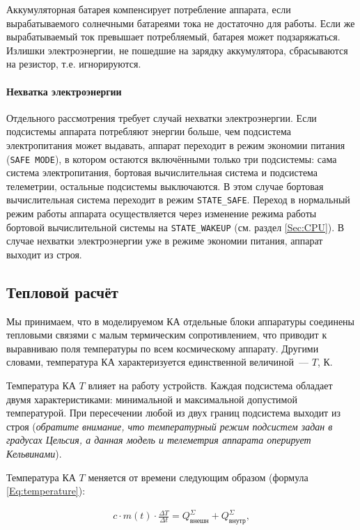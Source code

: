 \documentclass[12pt,a4paper]{article}
\begin{document}
Аккумуляторная батарея компенсирует потребление аппарата, если вырабатываемого солнечными
батареями тока не достаточно для работы. Если же вырабатываемый ток превышает
потребляемый, батарея может подзаряжаться. Излишки электроэнергии, не пошедшие на зарядку
аккумулятора, сбрасываются на резистор, т.е. игнорируются.

\paragraph{Нехватка электроэнергии}

Отдельного рассмотрения требует случай нехватки электроэнергии. Если подсистемы аппарата
потребляют энергии больше, чем подсистема электропитания может выдавать, аппарат переходит
в режим экономии питания (\verb'SAFE MODE'), в котором остаются включёнными только три
подсистемы: сама система электропитания, бортовая вычислительная система и подсистема
телеметрии, остальные подсистемы выключаются. В этом случае бортовая вычислительная
система переходит в режим \verb'STATE_SAFE'. Переход в нормальный режим работы аппарата
осуществляется через изменение режима работы бортовой вычислительной системы на
\verb'STATE_WAKEUP' (см. раздел \ref{Sec:CPU}). В случае нехватки электроэнергии уже в режиме экономии
питания, аппарат выходит из строя.

\subsection{Тепловой расчёт}
\label{Sec:Heat}

Мы принимаем, что в моделируемом КА отдельные блоки аппаратуры соединены тепловыми связями
с малым термическим сопротивлением, что приводит к выравниваю поля температуры по всем
космическому аппарату. Другими словами, температура КА характеризуется единственной
величиной~--– $T$, К.

Температура КА $T$ влияет на работу устройств. Каждая подсистема обладает двумя
характеристиками: минимальной и максимальной допустимой температурой. При пересечении
любой из двух границ подсистема выходит из строя (\emph{обратите внимание, что температурный
режим подсистем задан в градусах Цельсия, а данная модель и телеметрия аппарата оперирует
Кельвинами}).

Температура КА $T$ меняется от времени следующим образом (формула \ref{Eq:temperature}):

\begin{eqnarray}
c \cdot m(t) \cdot \frac{\Delta T}{\Delta t} = Q^{\Sigma}_{\text{внешн}} + Q^{\Sigma}_{\text{внутр}}, \label{Eq:temperature}
\end{eqnarray}
\end{document}
